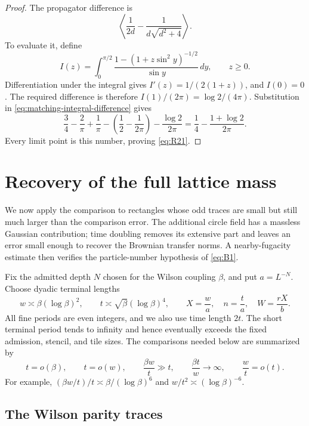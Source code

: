\begin{proof}
The propagator difference is
\[
 \left\langle\frac1{2d}-\frac1{d\sqrt{d^2+4}}\right\rangle.
\]
To evaluate it, define
\[
 I(z)=\int_0^{\pi/2}
     \frac{1-(1+z\sin^2 y)^{-1/2}}{\sin y}\,dy,
 \qquad z\ge0.
\]
Differentiation under the integral gives
$I'(z)=1/(2(1+z))$, and $I(0)=0$. The required difference is therefore
$I(1)/(2\pi)=\log2/(4\pi)$. Substitution in
\eqref{eq:matching-integral-difference} gives
\[
 \frac34-\frac2\pi+\frac1\pi
       -\left(\frac12-\frac1{2\pi}\right)-\frac{\log2}{2\pi}
   =\frac14-\frac{1+\log2}{2\pi}.
\]
Every limit point is this number, proving \eqref{eq:R21}.
\end{proof}

\section{Recovery of the full lattice mass}
\label{sec:assembly}

We now apply the comparison to rectangles whose odd traces are small but
still much larger than the comparison error. The additional circle field
has a massless Gaussian contribution; time doubling removes its extensive
part and leaves an error small enough to recover the Brownian transfer
norms. A nearby-fugacity estimate then verifies the particle-number
hypothesis of \eqref{eq:B1}.

Fix the admitted depth $N$ chosen for the Wilson coupling $\beta$, and put
$a=L^{-N}$. Choose dyadic terminal lengths
\begin{equation}
 w\asymp\beta(\log\beta)^2,
 \qquad t\asymp\sqrt\beta(\log\beta)^4,
 \qquad X=\frac wa,\quad n=\frac ta,\quad W=\frac{rX}{b}.
 \label{eq:assembly-rectangles}
\end{equation}
All fine periods are even integers, and we also use time length $2t$.
The short terminal period tends to infinity and hence eventually exceeds
the fixed admission, stencil, and tile sizes. The comparisons needed below
are summarized by
\begin{equation}
 t=o(\beta),\qquad t=o(w),\qquad
 \frac{\beta w}{t}\gg t,\qquad
 \frac{\beta t}{w}\longrightarrow\infty,
 \qquad \frac{w}{t}=o(t).
 \label{eq:assembly-scale-separations}
\end{equation}
For example, $(\beta w/t)/t\asymp\beta/(\log\beta)^6$ and
$w/t^2\asymp(\log\beta)^{-6}$.

\subsection{The Wilson parity traces}

